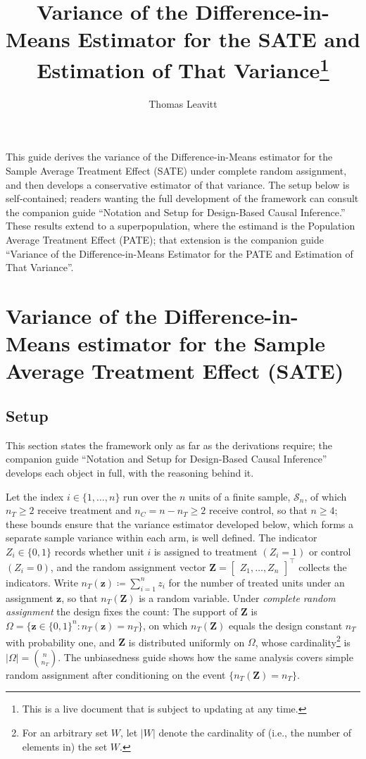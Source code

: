 \documentclass[12pt,leqno]{article}
\theoremstyle{newstyle}
\newcommand{\bZ}{\bm{Z}}   \newcommand{\bz}{\bm{z}}   %
\begin{document}
\title{Variance of the Difference-in-Means Estimator for the SATE and Estimation of That Variance\thanks{This is a live document that is subject to updating at any time.}}
\author{Thomas Leavitt}
\date{}
\maketitle

This guide derives the variance of the Difference-in-Means estimator for the Sample Average Treatment Effect (SATE) under complete random assignment, and then develops a conservative estimator of that variance. The setup below is self-contained; readers wanting the full development of the framework can consult the companion guide \enquote{Notation and Setup for Design-Based Causal Inference.} These results extend to a superpopulation, where the estimand is the Population Average Treatment Effect (PATE); that extension is the companion guide \enquote{Variance of the Difference-in-Means Estimator for the PATE and Estimation of That Variance}.

\section{Variance of the Difference-in-Means estimator for the Sample Average Treatment Effect (SATE)}

\subsection{Setup} \label{sec: SATE setup}

This section states the framework only as far as the derivations require; the companion guide \enquote{Notation and Setup for Design-Based Causal Inference} develops each object in full, with the reasoning behind it.

Let the index $i \in \{1, \ldots , n\}$ run over the $n$ units of a finite sample, $\mathcal{S}_n$, of which $n_T \geq 2$ receive treatment and $n_C = n - n_T \geq 2$ receive control, so that $n \geq 4$; these bounds ensure that the variance estimator developed below, which forms a separate sample variance within each arm, is well defined. The indicator $Z_i \in \{0, 1\}$ records whether unit $i$ is assigned to treatment $(Z_i = 1)$ or control $(Z_i = 0)$, and the random assignment vector $\bZ = \begin{bmatrix} Z_1, \dots , Z_n\end{bmatrix}^\top$ collects the indicators. Write $n_T(\bz) \coloneqq \sum_{i = 1}^n z_i$ for the number of treated units under an assignment $\bz$, so that $n_T(\bZ)$ is a random variable. Under \textit{complete random assignment} the design fixes the count: The support of $\bZ$ is $\Omega = \{\bz \in \{0, 1\}^n: n_T(\bz) = n_T\}$, on which $n_T(\bZ)$ equals the design constant $n_T$ with probability one, and $\bZ$ is distributed uniformly on $\Omega$, whose cardinality\footnote{For an arbitrary set $W$, let $\lvert W \rvert$ denote the cardinality of (i.e., the number of elements in) the set $W$.} is $\lvert \Omega \rvert = \binom{n}{n_T}$. The unbiasedness guide shows how the same analysis covers simple random assignment after conditioning on the event $\{n_T(\bZ) = n_T\}$.
\end{document}
